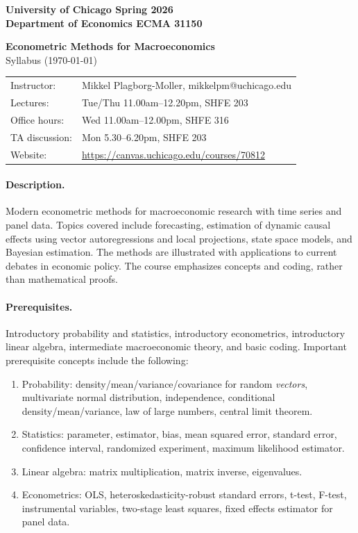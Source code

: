 \documentclass[12pt]{article}
\begin{document}
{\noindent \bf University of Chicago \hfill
Spring 2026 \\
Department of Economics \hfill ECMA 31150}

\bigskip
\begin{center}
{\large\bf Econometric Methods for Macroeconomics} \\
Syllabus (\today)
\end{center}
\bigskip

\noindent
\begin{tabular}{ll}
Instructor: & Mikkel Plagborg-Moller, mikkelpm@uchicago.edu\\[1ex]
Lectures: & Tue/Thu 11.00am--12.20pm, SHFE 203 \\[1ex]
Office hours: & Wed 11.00am--12.00pm, SHFE 316 \\[1ex]
TA discussion: & Mon 5.30--6.20pm, SHFE 203 \\[1ex]
Website: & \url{https://canvas.uchicago.edu/courses/70812} \\
\end{tabular}

\paragraph{Description.}
Modern econometric methods for macroeconomic research with time series and panel data. Topics covered include forecasting, estimation of dynamic causal effects using vector autoregressions and local projections, state space models, and Bayesian estimation. The methods are illustrated with applications to current debates in economic policy. The course emphasizes concepts and coding, rather than mathematical proofs.

\paragraph{Prerequisites.}
Introductory probability and statistics, introductory econometrics, introductory linear algebra, intermediate macroeconomic theory, and basic coding. Important prerequisite concepts include the following:
\begin{enumerate}
\item Probability: density{\slash}mean{\slash}variance{\slash}covariance for random \emph{vectors}, multivariate normal distribution, independence, conditional density{\slash}mean{\slash}variance, law of large numbers, central limit theorem.
\item Statistics: parameter, estimator, bias, mean squared error, standard error, confidence interval, randomized experiment, maximum likelihood estimator.
\item Linear algebra: matrix multiplication, matrix inverse, eigenvalues.
\item Econometrics: OLS, heteroskedasticity-robust standard errors, t-test, F-test, instrumental variables, two-stage least squares, fixed effects estimator for panel data.
\end{enumerate}
\end{document}
